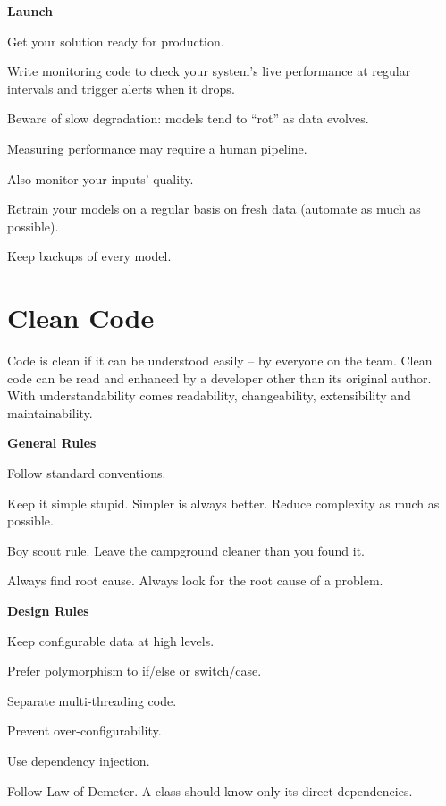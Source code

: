 \item \textbf{Launch}
\bit
\item Get your solution ready for production.
\item Write monitoring code to check your system's live performance at regular intervals and trigger alerts when it
drops.
\item Beware of slow degradation: models tend to ``rot'' as data evolves.
\item Measuring performance may require a human pipeline.
\item Also monitor your inputs' quality.
\item Retrain your models on a regular basis on fresh data (automate as much as possible).
\item Keep backups of every model.
\eit
\een

\chapter{Clean Code}\label{ch:clean_code}

Code is clean if it can be understood easily – by everyone on the team. Clean code can be read and enhanced by a
developer other than its original author. With understandability comes readability, changeability, extensibility and
maintainability.

\ben
\item \textbf{General Rules}
\bit
\item Follow standard conventions.
\item Keep it simple stupid. Simpler is always better. Reduce complexity as much as possible.
\item Boy scout rule. Leave the campground cleaner than you found it.
\item Always find root cause. Always look for the root cause of a problem.
\eit

\item \textbf{Design Rules}
\bit
\item Keep configurable data at high levels.
\item Prefer polymorphism to if/else or switch/case.
\item Separate multi-threading code.
\item Prevent over-configurability.
\item Use dependency injection.
\item Follow Law of Demeter. A class should know only its direct dependencies.
\eit

